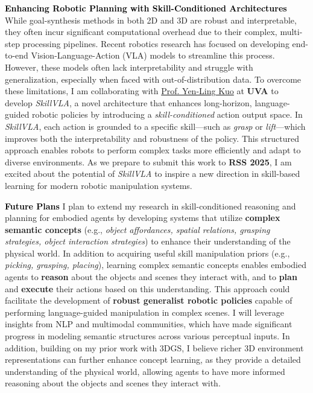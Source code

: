 \documentclass[10pt]{article}
\newcommand{\statement}[1]{\medskip\noindent
  \textcolor{black}{\textbf{#1}}\space
}
\begin{document}
\statement{Enhancing Robotic Planning with Skill-Conditioned Architectures} While goal-synthesis methods in both 2D and 3D are robust and interpretable, they often incur significant computational overhead due to their complex, multi-step processing pipelines. Recent robotics research has focused on developing end-to-end Vision-Language-Action (VLA) models to streamline this process. However, these models often lack interpretability and struggle with generalization, especially when faced with out-of-distribution data. To overcome these limitations, I am collaborating with \href{https://yenlingkuo.com/}{Prof. Yen-Ling Kuo} at \textbf{UVA} to develop \textit{SkillVLA}, a novel architecture that enhances long-horizon, language-guided robotic policies by introducing a \textit{skill-conditioned} action output space. In \textit{SkillVLA}, each action is grounded to a specific skill—such as \textit{grasp} or \textit{lift}—which improves both the interpretability and robustness of the policy. This structured approach enables robots to perform complex tasks more efficiently and adapt to diverse environments. As we prepare to submit this work to \textbf{RSS 2025}, I am excited about the potential of \textit{SkillVLA} to inspire a new direction in skill-based learning for modern robotic manipulation systems.

\statement{Future Plans} I plan to extend my research in skill-conditioned reasoning and planning for embodied agents by developing systems that utilize \textbf{complex semantic concepts} (e.g., \textit{object affordances, spatial relations, grasping strategies, object interaction strategies}) to enhance their understanding of the physical world. In addition to acquiring useful skill manipulation priors (e.g., \textit{picking, grasping, placing}), learning complex semantic concepts enables embodied agents to \textbf{reason} about the objects and scenes they interact with, and to \textbf{plan} and \textbf{execute} their actions based on this understanding. This approach could facilitate the development of \textbf{robust generalist robotic policies} capable of performing language-guided manipulation in complex scenes. I will leverage insights from NLP and multimodal communities, which have made significant progress in modeling semantic structures across various perceptual inputs. In addition, building on my prior work with 3DGS, I believe richer 3D environment representations can further enhance concept learning, as they provide a detailed understanding of the physical world, allowing agents to have more informed reasoning about the objects and scenes they interact with.
\end{document}
